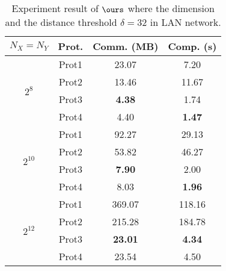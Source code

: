 \begin{table}[!t]
\caption{Experiment result of $\ours$ where the dimension  and the distance threshold $\delta = 32$ in LAN network.}
\label{tab:balanced_comp}
\centering
\begin{tabular}{cccc}
\toprule
$N_X = N_Y$             & Prot.   & Comm. (MB)                            & Comp. (s)                              \\ \midrule
    \multirow{4}{*}{$2^8$}              & Prot1      & 23.07                                 & 7.20                                 \\ \cmidrule{2-4} 
                                        & Prot2      & 13.46                                 & 11.67                               \\ \cmidrule{2-4} 
                                        & Prot3 & {\color[HTML]{3531FF} \textbf{4.38}}  &  1.74\\ \cmidrule{2-4} 
  & Prot4   & 4.40                                  &   {\color[HTML]{3531FF} \textbf{1.47 }}                              \\ \midrule
   \multirow{4}{*}{$2^{10}$}            & Prot1      & 92.27                                 & 29.13                                \\ \cmidrule{2-4} 
                                        & Prot2      & 53.82                                 & 46.27                                \\ \cmidrule{2-4} 
                                        & Prot3 & {\color[HTML]{3531FF} \textbf{7.90}}  & 2.00                               \\ \cmidrule{2-4} 
 & Prot4   & 8.03                                 & {\color[HTML]{3531FF} \textbf{1.96}} \\ \midrule
\multirow{4}{*}{$2^{12}$}            & Prot1      & 369.07                                & 118.16                               \\ \cmidrule{2-4} 
                                        & Prot2     & 215.28                                & 184.78                               \\ \cmidrule{2-4} 
                                        & Prot3 & {\color[HTML]{3531FF} \textbf{23.01}} &              {\color[HTML]{3531FF} \textbf{4.34}}                   \\ \cmidrule{2-4} 
 & Prot4   & 23.54                                 & 4.50  \\ \bottomrule
\end{tabular}%

\end{table}